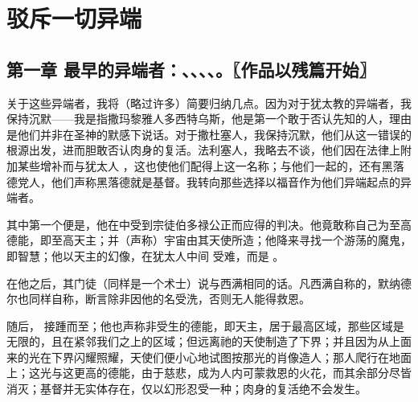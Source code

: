 
\chapter{驳斥一切异端}



\section{第一章 最早的异端者：、、、、。〖作品以残篇开始〗}

关于这些异端者，我将（略过许多）简要归纳几点。因为对于犹太教的异端者，我保持沉默——我是指撒玛黎雅人多西特乌斯，他是第一个敢于否认先知的人，理由是他们并非在圣神的默感下说话。对于撒杜塞人，我保持沉默，他们从这一错误的根源出发，进而胆敢否认肉身的复活。法利塞人，我略去不谈，他们因在法律上附加某些增补而与犹太人 ，这也使他们配得上这一名称；与他们一起的，还有黑落德党人，他们声称黑落德就是基督。我转向那些选择以福音作为他们异端起点的异端者。\par

其中第一个便是，他在中受到宗徒伯多禄公正而应得的判决。他竟敢称自己为至高德能，即至高天主；并（声称）宇宙由其天使所造；他降来寻找一个游荡的魔鬼，即智慧；他以天主的幻像，在犹太人中间  受难，而是 。\par

在他之后，其门徒（同样是一个术士）说与西满相同的话。凡西满自称的，默纳德尔也同样自称，断言除非因他的名受洗，否则无人能得救恩。\par

随后， 接踵而至；他也声称非受生的德能，即天主，居于最高区域，那些区域是无限的，且在紧邻我们之上的区域；但远离祂的天使制造了下界；并且因为从上面来的光在下界闪耀照耀，天使们便小心地试图按那光的肖像造人；那人爬行在地面上；这光与这更高的德能，由于慈悲，成为人内可蒙救恩的火花，而其余部分尽皆消灭；基督并无实体存在，仅以幻形忍受一种；肉身的复活绝不会发生。\par

